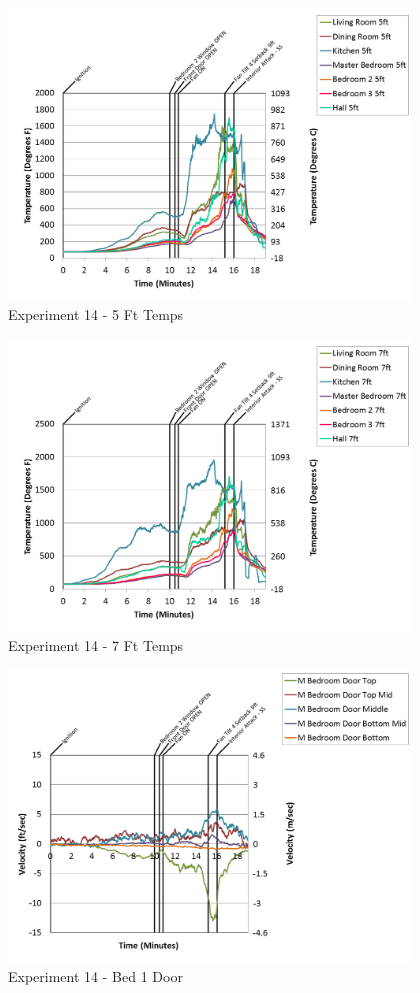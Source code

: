 \documentclass{article}
\begin{document}
\begin{appendices}
\begin{figure}[h!]
	\centering
	\includegraphics[height=3.05in]{0_Images/Results_Charts/Exp_14_Charts/5FtTemps.png}
	\caption{Experiment 14 - 5 Ft Temps}
\end{figure}


\begin{figure}[h!]
	\centering
	\includegraphics[height=3.05in]{0_Images/Results_Charts/Exp_14_Charts/7FtTemps.png}
	\caption{Experiment 14 - 7 Ft Temps}
\end{figure}

\clearpage

\begin{figure}[h!]
	\centering
	\includegraphics[height=3.05in]{0_Images/Results_Charts/Exp_14_Charts/Bed1Door.png}
	\caption{Experiment 14 - Bed 1 Door}
\end{figure}



\end{appendices}
\end{document}
